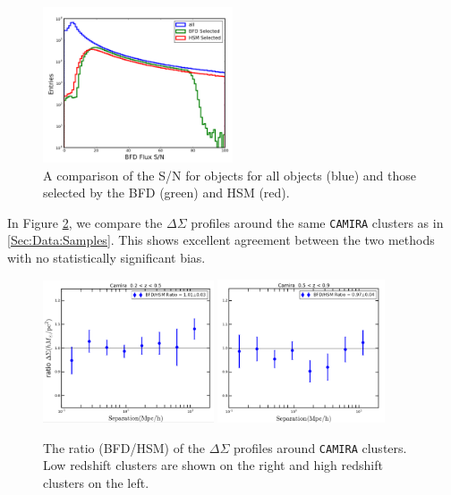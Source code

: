 \documentclass[useAMS,usenatbib]{mnras}
\begin{document}
\begin{figure}
    \includegraphics[width=0.5\textwidth]{bfd_hsm_flux_sn.png}
    \caption{
    A comparison of the S/N for objects for all objects (blue) and those selected by the BFD (green) and HSM (red).}
    \label{fig:bfd_hsm_flux_sn}
\end{figure}

In Figure \ref{fig:dsigma_hsm}, we compare the $\Delta\Sigma$ profiles around the same \texttt{CAMIRA} clusters as in \ref{Sec:Data:Samples}.  This shows excellent agreement between the two methods with no statistically significant bias.


\begin{figure}
    \includegraphics[width=0.45\textwidth]{bfd_hsm_lowz.png}
    \includegraphics[width=0.44\textwidth]{bfd_hsm_highz.png}
    \caption{
    The ratio (BFD/HSM) of the $\Delta\Sigma$ profiles around \texttt{CAMIRA} clusters. Low redshift clusters are shown on the right and high redshift clusters on the left.
    }
    \label{fig:dsigma_hsm}
\end{figure}
\end{document}
